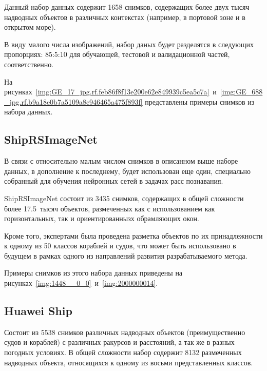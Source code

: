 Данный набор данных содержит 1658 снимков, содержащих более двух тысяч надводных объектов в различных контекстах (например, в портовой зоне и в открытом море).

В виду малого числа изображений, набор даных будет разделятся в следующих пропорциях: 85:5:10 для обучающей, тестовой и валидационной частей, соответственно.

На рисунках~\ref{img:GE_17_jpg.rf.feb86f8f13e200e62e849939c5ea5c7a}~и~\ref{img:GE_688_jpg.rf.b9a18e0b7a5109a8c946465a475f893f} представлены примеры снимков из набора данных.



\subsection*{ShipRSImageNet}

В связи с относительно малым числом снимков в описанном выше наборе данных, в дополнение к последнему, будет использован еще один, специально собранный для обучения нейронных сетей в задачах расс познавания.

ShipRSImageNet состоит из 3435 снимков, содержащих в общей сложности более 17.5~тысяч объектов, размеченных как с использованием как горизонтальных, так и ориентированнызх обрамляющих окон. 

Кроме того, экспертами была проведена разметка объектов по их принадлежности к одному из 50 классов кораблей и судов, что может быть использовано в будущем в рамках одного из направлений развития разрабатываемого метода.

Примеры снимков из этого набора данных приведены на рисунках~\ref{img:1448__0_0}~и~\ref{img:2000000014}.



\subsection*{Huawei Ship}

Состоит из 5538 снимков различных надводных объектов (преимущественно судов и кораблей) с различных ракурсов и расстояний, а так же в разных погодных условиях. В общей сложности набор содержит 8132 размеченных надводных объекта, относящихся к одному из восьми представленных классов. 

